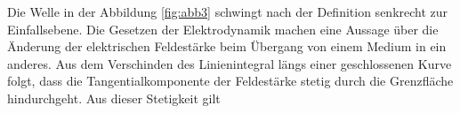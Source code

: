 Die Welle in der Abbildung \ref{fig:abb3} schwingt nach der Definition senkrecht zur Einfallsebene.
Die Gesetzen der Elektrodynamik machen eine Aussage über die Änderung der elektrischen Feldestärke beim Übergang von einem Medium in ein anderes.
Aus dem Verschinden des Linienintegral längs einer geschlossenen Kurve folgt, dass die Tangentialkomponente der Feldestärke stetig durch die Grenzfläche hindurchgeht.
Aus dieser Stetigkeit gilt
%
%
%
%
%
